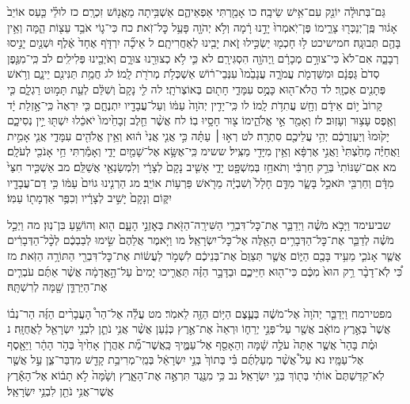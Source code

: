\documentclass[twoside, openany, parskip=half, 11pt]{book}
\begin{document}
גַּם־בְּתוּלָ֔ה יוֹנֵ֖ק עִם־אִ֥ישׁ שֵׂיבָֽה׃ 	כו אָמַ֖רְתִּי אַפְאֵיהֶ֑ם
אַשְׁבִּ֥יתָה מֵאֱנ֖וֹשׁ זִכְרָֽם׃ 	כז לוּלֵ֗י כַּ֤עַס אוֹיֵב֙ אָג֔וּר
פֶּֽן־יְנַכְּר֖וּ צָרֵ֑ימוֹ 	פֶּן־יֹֽאמְרוּ֙ יָדֵ֣נוּ רָ֔מָה
וְלֹ֥א יְהֹוָ֖ה פָּעַ֥ל כׇּל־זֹֽאת׃ 	כח כִּי־ג֛וֹי אֹבַ֥ד עֵצ֖וֹת הֵ֑מָּה
וְאֵ֥ין בָּהֶ֖ם תְּבוּנָֽה׃ 	חמישיכט ל֥וּ חָכְמ֖וּ יַשְׂכִּ֣ילוּ זֹ֑את
יָבִ֖ינוּ לְאַחֲרִיתָֽם׃ 	ל אֵיכָ֞ה יִרְדֹּ֤ף אֶחָד֙ אֶ֔לֶף
וּשְׁנַ֖יִם יָנִ֣יסוּ רְבָבָ֑ה 	אִם־לֹא֙ כִּי־צוּרָ֣ם מְכָרָ֔ם
וַֽיְהֹוָ֖ה הִסְגִּירָֽם׃ 	לא כִּ֛י לֹ֥א כְצוּרֵ֖נוּ צוּרָ֑ם
וְאֹיְבֵ֖ינוּ פְּלִילִֽים׃ 	לב כִּֽי־מִגֶּ֤פֶן סְדֹם֙ גַּפְנָ֔ם
וּמִשַּׁדְמֹ֖ת עֲמֹרָ֑ה 	עֲנָבֵ֙מוֹ֙ עִנְּבֵי־ר֔וֹשׁ
אַשְׁכְּלֹ֥ת מְרֹרֹ֖ת לָֽמוֹ׃ 	לג חֲמַ֥ת תַּנִּינִ֖ם יֵינָ֑ם
וְרֹ֥אשׁ פְּתָנִ֖ים אַכְזָֽר׃ 	לד הֲלֹא־ה֖וּא כָּמֻ֣ס עִמָּדִ֑י
חָת֖וּם בְּאוֹצְרֹתָֽי׃ 	לה לִ֤י נָקָם֙ וְשִׁלֵּ֔ם
לְעֵ֖ת תָּמ֣וּט רַגְלָ֑ם 	כִּ֤י קָרוֹב֙ י֣וֹם אֵידָ֔ם
וְחָ֖שׁ עֲתִדֹ֥ת לָֽמוֹ׃ 	לו כִּֽי־יָדִ֤ין יְהֹוָה֙ עַמּ֔וֹ
וְעַל־עֲבָדָ֖יו יִתְנֶחָ֑ם 	כִּ֤י יִרְאֶה֙ כִּֽי־אָ֣זְלַת יָ֔ד
וְאֶ֖פֶס עָצ֥וּר וְעָזֽוּב׃ 	לז וְאָמַ֖ר אֵ֣י אֱלֹהֵ֑ימוֹ
צ֖וּר חָסָ֥יוּ בֽוֹ׃ 	לח אֲשֶׁ֨ר חֵ֤לֶב זְבָחֵ֙ימוֹ֙ יֹאכֵ֔לוּ
יִשְׁתּ֖וּ יֵ֣ין נְסִיכָ֑ם 	יָק֙וּמוּ֙ וְיַעְזְרֻכֶ֔ם
יְהִ֥י עֲלֵיכֶ֖ם סִתְרָֽה׃ 	לט רְא֣וּ ׀ עַתָּ֗ה כִּ֣י אֲנִ֤י אֲנִי֙ ה֔וּא
וְאֵ֥ין אֱלֹהִ֖ים עִמָּדִ֑י 	אֲנִ֧י אָמִ֣ית וַאֲחַיֶּ֗ה
מָחַ֙צְתִּי֙ וַאֲנִ֣י אֶרְפָּ֔א 	וְאֵ֥ין מִיָּדִ֖י מַצִּֽיל׃
ששימ כִּֽי־אֶשָּׂ֥א אֶל־שָׁמַ֖יִם יָדִ֑י 	וְאָמַ֕רְתִּי חַ֥י אָנֹכִ֖י לְעֹלָֽם׃
מא אִם־שַׁנּוֹתִי֙ בְּרַ֣ק חַרְבִּ֔י 	וְתֹאחֵ֥ז בְּמִשְׁפָּ֖ט יָדִ֑י
אָשִׁ֤יב נָקָם֙ לְצָרָ֔י 	וְלִמְשַׂנְאַ֖י אֲשַׁלֵּֽם׃
מב אַשְׁכִּ֤יר חִצַּי֙ מִדָּ֔ם 	וְחַרְבִּ֖י תֹּאכַ֣ל בָּשָׂ֑ר
מִדַּ֤ם חָלָל֙ וְשִׁבְיָ֔ה 	מֵרֹ֖אשׁ פַּרְע֥וֹת אוֹיֵֽב׃
מג הַרְנִ֤ינוּ גוֹיִם֙ עַמּ֔וֹ 	כִּ֥י דַם־עֲבָדָ֖יו יִקּ֑וֹם
וְנָקָם֙ יָשִׁ֣יב לְצָרָ֔יו 	וְכִפֶּ֥ר אַדְמָת֖וֹ עַמּֽוֹ׃

שביעימד וַיָּבֹ֣א מֹשֶׁ֗ה וַיְדַבֵּ֛ר אֶת־כׇּל־דִּבְרֵ֥י הַשִּׁירָֽה־הַזֹּ֖את בְּאׇזְנֵ֣י הָעָ֑ם ה֖וּא וְהוֹשֵׁ֥עַ בִּן־נֽוּן׃ מה וַיְכַ֣ל מֹשֶׁ֗ה לְדַבֵּ֛ר אֶת־כׇּל־הַדְּבָרִ֥ים הָאֵ֖לֶּה אֶל־כׇּל־יִשְׂרָאֵֽל׃ מו וַיֹּ֤אמֶר אֲלֵהֶם֙ שִׂ֣ימוּ לְבַבְכֶ֔ם לְכׇ֨ל־הַדְּבָרִ֔ים אֲשֶׁ֧ר אָנֹכִ֛י מֵעִ֥יד בָּכֶ֖ם הַיּ֑וֹם אֲשֶׁ֤ר תְּצַוֻּם֙ אֶת־בְּנֵיכֶ֔ם לִשְׁמֹ֣ר לַעֲשׂ֔וֹת אֶת־כׇּל־דִּבְרֵ֖י הַתּוֹרָ֥ה הַזֹּֽאת׃ מז כִּ֠י לֹֽא־דָבָ֨ר רֵ֥ק הוּא֙ מִכֶּ֔ם כִּי־ה֖וּא חַיֵּיכֶ֑ם וּבַדָּבָ֣ר הַזֶּ֗ה תַּאֲרִ֤יכוּ יָמִים֙ עַל־הָ֣אֲדָמָ֔ה אֲשֶׁ֨ר אַתֶּ֜ם עֹבְרִ֧ים אֶת־הַיַּרְדֵּ֛ן שָׁ֖מָּה לְרִשְׁתָּֽהּ׃


מפטירמח וַיְדַבֵּ֤ר יְהֹוָה֙ אֶל־מֹשֶׁ֔ה בְּעֶ֛צֶם הַיּ֥וֹם הַזֶּ֖ה לֵאמֹֽר׃ מט עֲלֵ֡ה אֶל־הַר֩ הָעֲבָרִ֨ים הַזֶּ֜ה הַר־נְב֗וֹ אֲשֶׁר֙ בְּאֶ֣רֶץ מוֹאָ֔ב אֲשֶׁ֖ר עַל־פְּנֵ֣י יְרֵח֑וֹ וּרְאֵה֙ אֶת־אֶ֣רֶץ כְּנַ֔עַן אֲשֶׁ֨ר אֲנִ֥י נֹתֵ֛ן לִבְנֵ֥י יִשְׂרָאֵ֖ל לַאֲחֻזָּֽה׃ נ וּמֻ֗ת בָּהָר֙ אֲשֶׁ֤ר אַתָּה֙ עֹלֶ֣ה שָׁ֔מָּה וְהֵאָסֵ֖ף אֶל־עַמֶּ֑יךָ כַּֽאֲשֶׁר־מֵ֞ת אַהֲרֹ֤ן אָחִ֙יךָ֙ בְּהֹ֣ר הָהָ֔ר וַיֵּאָ֖סֶף אֶל־עַמָּֽיו׃ נא עַל֩ אֲשֶׁ֨ר מְעַלְתֶּ֜ם בִּ֗י בְּתוֹךְ֙ בְּנֵ֣י יִשְׂרָאֵ֔ל בְּמֵֽי־מְרִיבַ֥ת קָדֵ֖שׁ מִדְבַּר־צִ֑ן עַ֣ל אֲשֶׁ֤ר לֹֽא־קִדַּשְׁתֶּם֙ אוֹתִ֔י בְּת֖וֹךְ בְּנֵ֥י יִשְׂרָאֵֽל׃ נב כִּ֥י מִנֶּ֖גֶד תִּרְאֶ֣ה אֶת־הָאָ֑רֶץ וְשָׁ֙מָּה֙ לֹ֣א תָב֔וֹא אֶל־הָאָ֕רֶץ אֲשֶׁר־אֲנִ֥י נֹתֵ֖ן לִבְנֵ֥י יִשְׂרָאֵֽל׃
\end{document}
